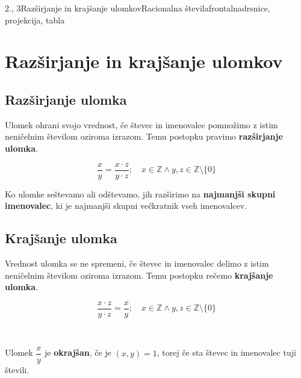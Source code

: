 \begin{priprava}{2., 3}{}{Razširjanje in krajšanje ulomkov}{Racionalna števila}{frontalna}{drsnice, projekcija, tabla}

    \section{Razširjanje in krajšanje ulomkov}

        

            \subsection*{Razširjanje ulomka}
                Ulomek ohrani svojo vrednost, če števec in imenovalec pomnožimo z istim neničelnim številom oziroma izrazom.
                Temu postopku pravimo \textbf{razširjanje ulomka}.

                $$\dfrac{x}{y}=\dfrac{x\cdot z}{y\cdot z}; \quad x\in\mathbb{Z} \land y,z\in\mathbb{Z}\setminus\{0\}$$
            

            
                Ko ulomke seštevamo ali odštevamo, jih razširimo na \textbf{najmanjši skupni imenovalec}, 
                ki je najmanjši skupni večkratnik vseh imenovalcev.
            

        

        
            \subsection*{Krajšanje ulomka}
                Vrednost ulomka se ne spremeni, če števec in imenovalec delimo z istim neničelnim številom oziroma izrazom.
                Temu postopku rečemo \textbf{krajšanje ulomka}.

                $$\dfrac{x\cdot z}{y\cdot z}=\dfrac{x}{y}; \quad x\in\mathbb{Z}\land y,z\in\mathbb{Z}\setminus\{0\} $$
            
                ~

                Ulomek $\dfrac{x}{y}$ je \textbf{okrajšan}, če je $(x,y)=1$, torej če sta števec in imenovalec tuji števili.
            
        
            ~\\


        \begin{multicols}{2}


\end{multicols}
\end{priprava}
